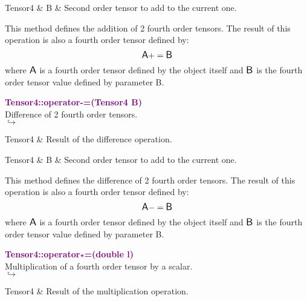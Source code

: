 \begin{tcolorbox}[width=\textwidth,myArgs,tabularx={ll|R}]
Tensor4 & B & Second order tensor to add to the current one.
\end{tcolorbox}

This method defines the addition of 2 fourth order tensors.
The result of this operation is also a fourth order tensor defined by:
\begin{equation*}
\mbox{\large\ensuremath{\mathsf{A}}} += \mbox{\large\ensuremath{\mathsf{B}}}
\end{equation*}
where $\mbox{\large\ensuremath{\mathsf{A}}}$ is a fourth order tensor defined by the object itself and $\mbox{\large\ensuremath{\mathsf{B}}}$ is the fourth order tensor value defined by parameter B.

\textcolor{purple}{\textbf{Tensor4::operator-=(Tensor4 B)}}\label{Tensor4::operator-=(Tensor4 B)}\\
Difference of 2 fourth order tensors.\\ \hspace*{5mm}$\hookrightarrow$
\vspace*{-2em}\begin{tcolorbox}[grow to left by=-1cm, width=\textwidth-1cm,myArgs,tabularx={l|R}]
Tensor4 & Result of the difference operation.
\end{tcolorbox}

\begin{tcolorbox}[width=\textwidth,myArgs,tabularx={ll|R}]
Tensor4 & B & Second order tensor to add to the current one.
\end{tcolorbox}

This method defines the difference of 2 fourth order tensors.
The result of this operation is also a fourth order tensor defined by:
\begin{equation*}
\mbox{\large\ensuremath{\mathsf{A}}} -= \mbox{\large\ensuremath{\mathsf{B}}}
\end{equation*}
where $\mbox{\large\ensuremath{\mathsf{A}}}$ is a fourth order tensor defined by the object itself and $\mbox{\large\ensuremath{\mathsf{B}}}$ is the fourth order tensor value defined by parameter B.

\textcolor{purple}{\textbf{Tensor4::operator$\star$=(double l)}}\label{Tensor4::operator*=(double l)}\\
Multiplication of a fourth order tensor by a scalar.\\ \hspace*{5mm}$\hookrightarrow$
\vspace*{-2em}\begin{tcolorbox}[grow to left by=-1cm, width=\textwidth-1cm,myArgs,tabularx={l|R}]
Tensor4 & Result of the multiplication operation.
\end{tcolorbox}

